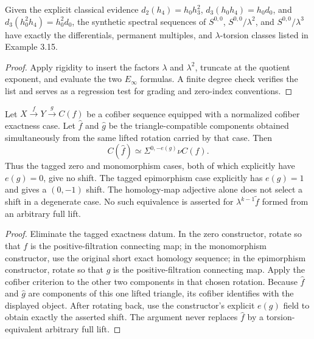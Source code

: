 \begin{proposition}
  \label{prop:synthetic-14-stem-regression}
  \notready
  Given the explicit classical evidence
  $d_2(h_4)=h_0h_3^2$,
  $d_3(h_0h_4)=h_0d_0$, and
  $d_3(h_0^2h_4)=h_0^2d_0$, the synthetic spectral sequences of
  $S^{0,0}$, $S^{0,0}/\lambda^2$, and $S^{0,0}/\lambda^3$ have exactly the
  differentials, permanent multiples, and $\lambda$-torsion classes listed in
  Example 3.15.
\end{proposition}

\begin{proof}
  Apply rigidity to insert the factors $\lambda$ and $\lambda^2$, truncate at
  the quotient exponent, and evaluate the two $E_\infty$ formulas.  A finite
  degree check verifies the list and serves as a regression test for grading
  and zero-index conventions.
\end{proof}

\begin{proposition}
  \label{prop:synthetic-hat-cofiber}
  \notready
  Let $X\xrightarrow fY\xrightarrow gC(f)$ be a cofiber sequence equipped with
  a normalized cofiber exactness case.  Let $\widehat f$ and $\widehat g$ be
  the triangle-compatible components obtained simultaneously from the same
  lifted rotation carried by that case.  Then
  \[
    C(\widehat f)\simeq\Sigma^{0,-e(g)}\nu C(f).
  \]
  Thus the tagged zero and monomorphism cases, both of which explicitly have
  $e(g)=0$, give no shift.  The tagged epimorphism case explicitly has
  $e(g)=1$ and gives a $(0,-1)$ shift.  The homology-map adjective alone does
  not select a shift in a degenerate case.  No such equivalence is asserted for
  $\lambda^{k-1}\widetilde f$ formed from an arbitrary full lift.
\end{proposition}

\begin{proof}
  Eliminate the tagged exactness datum.  In the zero constructor, rotate so
  that $f$ is the positive-filtration connecting map; in the monomorphism
  constructor, use the original short exact homology sequence; in the
  epimorphism constructor, rotate so that $g$ is the positive-filtration
  connecting map.
  Apply the cofiber criterion to the other two components in that chosen
  rotation.  Because $\widehat f$ and $\widehat g$ are components of this one
  lifted triangle, its cofiber identifies with the displayed object.  After
  rotating back, use the constructor's explicit $e(g)$ field to obtain exactly
  the asserted shift.  The argument never
  replaces $\widehat f$ by a torsion-equivalent arbitrary full lift.
\end{proof}

